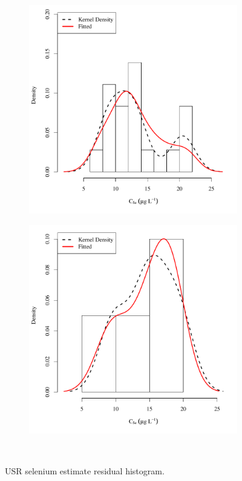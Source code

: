 \subfiguremid
\begin{landscape}
	\begin{figure}
		\begin{subfigure}{0.7\textwidth}
			\centering
			\includegraphics[width=\tableCustomSize]{"Figures/Results_USR/Stochastic/Conc Model ResDist TIM"}
		\end{subfigure}%
		\begin{subfigure}{0.7\textwidth}
			\centering
			\includegraphics[width=\tableCustomSize]{"Figures/Results_USR/Stochastic/Conc Model ResDist HRC"}
		\end{subfigure}\\
		\caption{USR selenium estimate residual histogram.}
	\end{figure}
\end{landscape}

